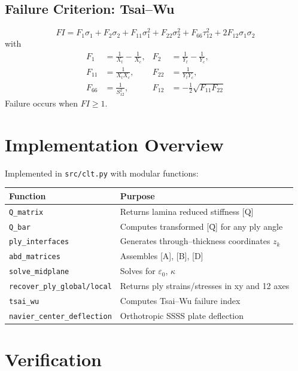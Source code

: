 \documentclass[12pt,a4paper]{article}
\begin{document}
\subsection{Failure Criterion: Tsai–Wu}
\begin{equation}
FI = F_1\sigma_1 + F_2\sigma_2 +
F_{11}\sigma_1^2 + F_{22}\sigma_2^2 +
F_{66}\tau_{12}^2 + 2F_{12}\sigma_1\sigma_2
\end{equation}
with
\begin{align}
F_1 &= \frac{1}{X_t}-\frac{1}{X_c}, & 
F_2 &= \frac{1}{Y_t}-\frac{1}{Y_c},\\
F_{11} &= \frac{1}{X_tX_c}, &
F_{22} &= \frac{1}{Y_tY_c},\\
F_{66} &= \frac{1}{S_{12}^2}, &
F_{12} &= -\tfrac{1}{2}\sqrt{F_{11}F_{22}}
\end{align}
Failure occurs when $FI\ge1$.

\section{Implementation Overview}
Implemented in \texttt{src/clt.py} with modular functions:
\begin{center}
\begin{tabular}{ll}
\toprule
Function & Purpose\\
\midrule
\texttt{Q\_matrix} & Returns lamina reduced stiffness [Q]\\
\texttt{Q\_bar} & Computes transformed [\={Q}] for any ply angle\\
\texttt{ply\_interfaces} & Generates through--thickness coordinates $z_k$\\
\texttt{abd\_matrices} & Assembles [A], [B], [D]\\
\texttt{solve\_midplane} & Solves for $\varepsilon_0$, $\kappa$\\
\texttt{recover\_ply\_global/local} & Returns ply strains/stresses in xy and 12 axes\\
\texttt{tsai\_wu} & Computes Tsai--Wu failure index\\
\texttt{navier\_center\_deflection} & Orthotropic SSSS plate deflection\\
\bottomrule
\end{tabular}
\end{center}

\section{Verification}
\end{document}
